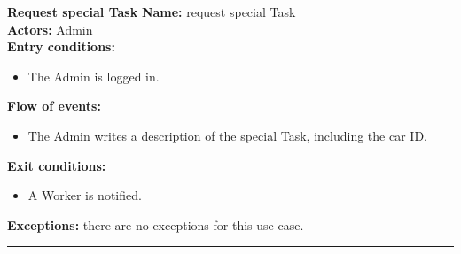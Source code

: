 \textbf{\large Request special Task}
\bigbreak
\textbf{Name:} request special Task \\
\textbf{Actors:} Admin \\
\textbf{Entry conditions:} 
\begin{itemize}
\item The Admin is logged in.
\end{itemize}
\textbf{Flow of events:} 
\begin{itemize}
\item The Admin writes a description of the special Task, including the car ID.
\end{itemize}
\textbf{Exit conditions:} 
\begin{itemize}
\item A Worker is notified.
\end{itemize}
\textbf{Exceptions:} there are no exceptions for this use case.\\


\begin{center}
\noindent\rule{8cm}{1.0pt}
\end{center}
